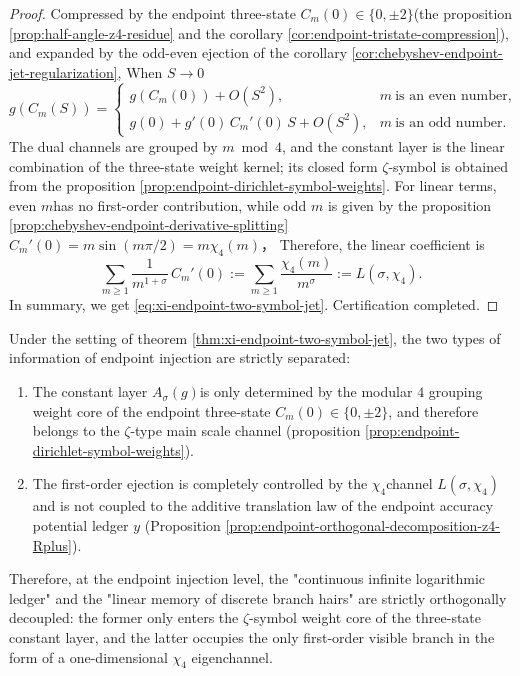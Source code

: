 \begin{proof}
Compressed by the endpoint three-state \(C_m(0)\in\{0,\pm 2\}\) ​​(the proposition \ref{prop:half-angle-z4-residue} and the corollary \ref{cor:endpoint-tristate-compression}), and expanded by the odd-even ejection of the corollary \ref{cor:chebyshev-endpoint-jet-regularization},
When \(S\to 0\)
\[
g(C_m(S))=
\begin{cases}
g(C_m(0))+O(S^2), & m\ \text{is an even number},\\
g(0)+g'(0)\,C_m'(0)\,S+O(S^2), & m\ \text{is an odd number}.
\end{cases}
\]
The dual channels are grouped by \(m\bmod 4\), and the constant layer is the linear combination of the three-state weight kernel; its closed form \(\zeta\)-symbol is obtained from the proposition \ref{prop:endpoint-dirichlet-symbol-weights}.
For linear terms, even \(m\) ​​has no first-order contribution, while odd \(m\) is given by the proposition \ref{prop:chebyshev-endpoint-derivative-splitting}
\(
C_m'(0)=m\sin(m\pi/2)=m\chi_4(m)
\)，
Therefore, the linear coefficient is
\[
\sum_{m\ge 1}\frac{1}{m^{1+\sigma}}\,C_m'(0)
:=\sum_{m\ge 1}\frac{\chi_4(m)}{m^\sigma}
:=L(\sigma,\chi_4).
\]
In summary, we get \eqref{eq:xi-endpoint-two-symbol-jet}. Certification completed.
\end{proof}

\begin{corollary}\label{cor:xi-endpoint-jet-orthogonal-decoupling}
Under the setting of theorem \ref{thm:xi-endpoint-two-symbol-jet}, the two types of information of endpoint injection are strictly separated:
\begin{enumerate}
  \item The constant layer \(A_\sigma(g)\) ​​is only determined by the modular \(4\) grouping weight core of the endpoint three-state \(C_m(0)\in\{0,\pm 2\}\), and therefore belongs to the \(\zeta\)-type main scale channel (proposition \ref{prop:endpoint-dirichlet-symbol-weights}).
  \item The first-order ejection is completely controlled by the \(\chi_4\) ​​channel \(L(\sigma,\chi_4)\) and is not coupled to the additive translation law of the endpoint accuracy potential ledger \(y\) (Proposition \ref{prop:endpoint-orthogonal-decomposition-z4-Rplus}).
\end{enumerate}
Therefore, at the endpoint injection level, the "continuous infinite logarithmic ledger" and the "linear memory of discrete branch hairs" are strictly orthogonally decoupled: the former only enters the \(\zeta\)-symbol weight core of the three-state constant layer, and the latter occupies the only first-order visible branch in the form of a one-dimensional \(\chi_4\) eigenchannel.
\end{corollary}

